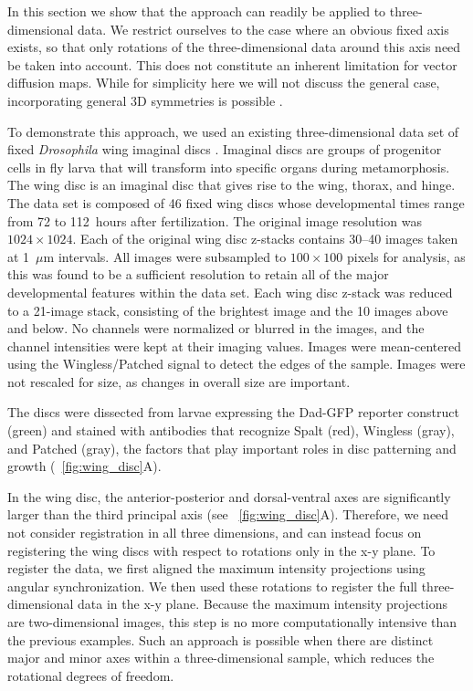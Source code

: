 In this section we show that the approach can readily be applied to three-dimensional data. 
%
We restrict ourselves to the case where an obvious fixed axis exists, so that only rotations of the three-dimensional data around this axis need be taken into account.  
%
This does not constitute an inherent limitation for vector diffusion maps. 
%
While for simplicity here we will not discuss the general  case, incorporating general 3D symmetries is possible \citep{arie2012global, wang2013exact, cucuringu2012eigenvector}. 

To demonstrate this approach, we used an existing three-dimensional data set of fixed {\em Drosophila} wing imaginal discs \citep{hamaratoglu2011dpp}.
%
Imaginal discs are groups of progenitor cells in fly larva that will transform into specific organs during metamorphosis.
%
The wing disc is an imaginal disc that gives rise to the wing, thorax, and hinge.
%
The data set is composed of 46 fixed wing discs whose developmental times range from 72 to 112~hours after fertilization.
%
The original image resolution was $1024 \times 1024$.
%
Each of the original wing disc z-stacks contains 30--40 images taken at 1~$\mu$m intervals. 
%
All images were subsampled to $100 \times 100$ pixels for analysis, as this was found to be a sufficient resolution to retain all of the major developmental features within the data set. 
%
Each wing disc z-stack was reduced to a 21-image stack, consisting of the brightest image and the 10 images above and below.
%
No channels were normalized or blurred in the images, and the channel intensities were kept at their imaging values. 
%
Images were mean-centered using the Wingless/Patched signal to detect the edges of the sample. 
%
Images were not rescaled for size, as changes in overall size are important. 

The discs were dissected from larvae expressing the Dad-GFP reporter construct (green) and stained with antibodies that recognize Spalt (red), Wingless (gray), and Patched (gray), the factors that play important roles in disc patterning and growth (\fig~\ref{fig:wing_disc}A).

In the wing disc, the anterior-posterior and dorsal-ventral axes are significantly larger than the third principal axis (see \fig~\ref{fig:wing_disc}A). 
%
Therefore, we need not consider registration in all three dimensions, and can instead focus on registering the wing discs with respect to rotations only in the x-y plane.
%
To register the data, we first aligned the maximum intensity projections using angular synchronization.
%
We then used these rotations to register the full three-dimensional data in the x-y plane.
%
Because the maximum intensity projections are two-dimensional images, this step is no more computationally intensive than the previous examples.
%
Such an approach is possible when there are distinct major and minor axes within a three-dimensional sample, which reduces the rotational degrees of freedom.

